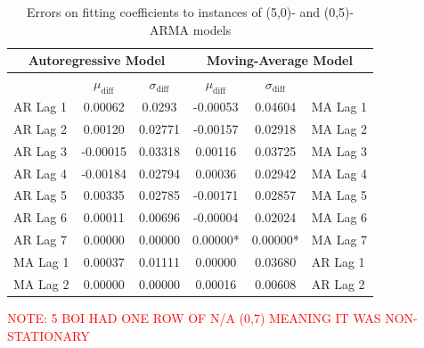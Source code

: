 \documentclass[oneside,12pt,openany]{book}
\begin{document}
     \begin{table}[!ht]
        \centering
        \begin{tabular}{|l|c|c|c|c|l|}
            \hline
            \multicolumn{3}{|c|}{Autoregressive Model} & \multicolumn{3}{c|}{Moving-Average Model} \\ \hline
            \cellcolor{black} & $\mu_{\text{diff}}$ & $\sigma_{\text{diff}}$ & $\mu_{\text{diff}}$ & $\sigma_{\text{diff}}$ &  \cellcolor{black} \\ \hline
            AR Lag 1 & 0.00062 & 0.0293 & -0.00053 & 0.04604 & MA Lag 1 \\ \hline
            AR Lag 2 & 0.00120 & 0.02771 & -0.00157 & 0.02918 & MA Lag 2 \\ \hline
            AR Lag 3 & -0.00015 & 0.03318 & 0.00116 & 0.03725 & MA Lag 3 \\ \hline
            AR Lag 4 & -0.00184 & 0.02794 & 0.00036 & 0.02942 & MA Lag 4 \\ \hline
            AR Lag 5 & 0.00335 & 0.02785 & -0.00171 & 0.02857 & MA Lag 5 \\ \hline
            AR Lag 6 & 0.00011 & 0.00696 & -0.00004 & 0.02024 & MA Lag 6 \\ \hline
            AR Lag 7 & 0.00000 & 0.00000 & 0.00000* & 0.00000* & MA Lag 7 \\ \hline
            MA Lag 1 & 0.00037 & 0.01111 & 0.00000 & 0.03680 & AR Lag 1 \\ \hline
            MA Lag 2 & 0.00000 & 0.00000 & 0.00016 & 0.00608 & AR Lag 2 \\ \hline
        \end{tabular}
        \caption{Errors on fitting coefficients to instances of (5,0)- and (0,5)-ARMA models}
        \label{tab:errortsfitting5}
    \end{table}

    \textcolor{red}{NOTE: 5 BOI HAD ONE ROW OF N/A (0,7) MEANING IT WAS NON-STATIONARY}
    
\end{document}
